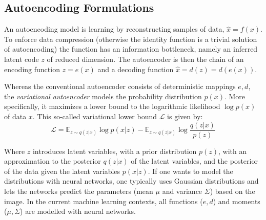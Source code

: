 	\subsection{Autoencoding Formulations}\label{sec:autoencoding}
		An autoencoding model is learning by reconstructing samples of data, $\hat x = f(x)$. To enforce data compression (otherwise the identity function is a trivial solution of autoencoding) the function has an information bottleneck, namely an inferred latent code $z$ of reduced dimension. The autoencoder is then the chain of an encoding function $z = e(x)$ and a decoding function $\hat x = d(z) = d(e(x))$.

		Whereas the conventional autoencoder consists of deterministic mappings $e, d$, the \textit{variational autoencoder} \cite{kingma13vae} models the probability distribution $p(x)$. More specifically, it maximizes a lower bound to the logarithmic likelihood $\log p(x)$ of data $x$. This so-called variational lower bound $\mathcal{L}$ is given by:
		\begin{equation}\label{eq:vae}
			\mathcal{L} = \mathds{E}_{z\sim q(z|x)}  \log p(x|z) - \mathds{E}_{z\sim q(z|x)} \log \frac{q(z|x)}{p(z)}
		\end{equation}

		Where $z$ introduces latent variables, with a prior distribution $p(z)$, with an approximation to the posterior $q(z|x)$ of the latent variables, and the posterior of the data given the latent variables $p(x|z)$. If one wants to model the distributions with neural networks, one typically uses Gaussian distributions and lets the networks predict the parameters (mean $\mu$ and variance $\Sigma$) based on the image.
		In the current machine learning contexts, all functions ($e, d$) and moments ($\mu, \Sigma$) are modelled with neural networks.

